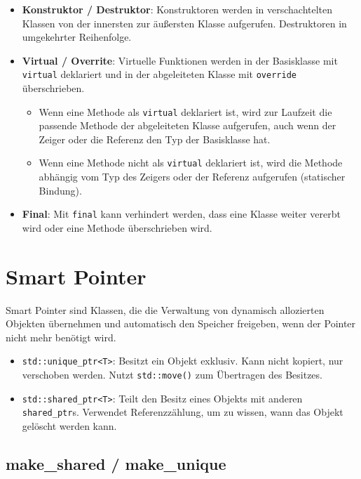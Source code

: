 \documentclass[9pt, landscape]{article}
\newcommand{\datastruct}[1]{\textbf{\textcolor{red!60!black}{#1}}}
\begin{document}
\begin{multicols*}{4}
\begin{itemize}
   \item \datastruct{Konstruktor / Destruktor}: Konstruktoren werden in verschachtelten Klassen von der innersten zur äußersten Klasse aufgerufen. Destruktoren in umgekehrter Reihenfolge.
   \item \datastruct{Virtual / Overrite}: Virtuelle Funktionen werden in der Basisklasse mit \lstinline|virtual| deklariert und in der abgeleiteten Klasse mit \lstinline|override| überschrieben.
   \begin{itemize}
        \item Wenn eine Methode als \lstinline|virtual| deklariert ist, wird zur Laufzeit die passende Methode der abgeleiteten Klasse aufgerufen, auch wenn der Zeiger oder die Referenz den Typ der Basisklasse hat.
        \item Wenn eine Methode nicht als \lstinline|virtual| deklariert ist, wird die Methode abhängig vom Typ des Zeigers oder der Referenz aufgerufen (statischer Bindung).
   \end{itemize}
   \item \datastruct{Final}: Mit \lstinline|final| kann verhindert werden, dass eine Klasse weiter vererbt wird oder eine Methode überschrieben wird.
\end{itemize}

\section{Smart Pointer}

Smart Pointer sind Klassen, die die Verwaltung von dynamisch allozierten Objekten übernehmen und automatisch den Speicher freigeben, wenn der Pointer nicht mehr benötigt wird.

\begin{itemize}
    \item \lstinline|std::unique_ptr<T>|: Besitzt ein Objekt exklusiv. Kann nicht kopiert, nur verschoben werden. Nutzt \lstinline|std::move()| zum Übertragen des Besitzes.
    \item \lstinline|std::shared_ptr<T>|: Teilt den Besitz eines Objekts mit anderen \lstinline|shared_ptr|s. Verwendet Referenzzählung, um zu wissen, wann das Objekt gelöscht werden kann.
\end{itemize}

\subsection*{make\_shared / make\_unique}


\end{multicols*}
\end{document}

